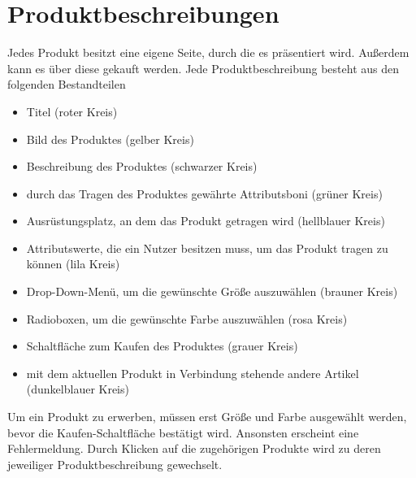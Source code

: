 \section{Produktbeschreibungen}
Jedes Produkt besitzt eine eigene Seite, durch die es präsentiert wird. Außerdem kann es über diese gekauft werden. Jede Produktbeschreibung besteht aus den folgenden Bestandteilen
\begin{itemize}
  \item Titel (roter Kreis)
  \vspace*{-0.5em}
  \item Bild des Produktes (gelber Kreis)
  \vspace*{-0.5em}
  \item Beschreibung des Produktes (schwarzer Kreis)
  \vspace*{-0.5em}
  \item durch das Tragen des Produktes gewährte Attributsboni  (grüner Kreis)
  \vspace*{-0.5em}
  \item Ausrüstungsplatz, an dem das Produkt getragen wird (hellblauer Kreis)
  \vspace*{-0.5em}
  \item Attributswerte, die ein Nutzer besitzen muss, um das Produkt tragen zu können (lila Kreis)
  \vspace*{-0.5em}
  \item Drop-Down-Menü, um die gewünschte Größe auszuwählen (brauner Kreis)
  \vspace*{-0.5em}
  \item Radioboxen, um die gewünschte Farbe auszuwählen (rosa Kreis)
  \vspace*{-0.5em}
  \item Schaltfläche zum Kaufen des Produktes (grauer Kreis)
  \vspace*{-0.5em}
  \item mit dem aktuellen Produkt in Verbindung stehende andere Artikel (dunkelblauer Kreis)
\end{itemize}
Um ein Produkt zu erwerben, müssen erst Größe und Farbe ausgewählt werden, bevor die Kaufen-Schaltfläche bestätigt wird. Ansonsten erscheint eine Fehlermeldung. Durch Klicken auf die zugehörigen Produkte wird zu deren jeweiliger Produktbeschreibung gewechselt.


